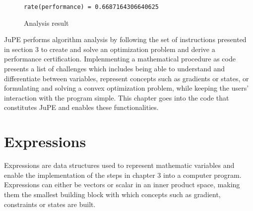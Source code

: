 \begin{figure}[hbtp]
\begin{lstlisting}
rate(performance) = 0.6687164306640625
\end{lstlisting}
\caption{Analysis result}
\label{ex_result}
\end{figure}

JuPE performs algorithm analysis by following the set of instructions presented in section 3 to create and solve an optimization problem and derive a performance certification. Implenmenting a mathematical procedure as code presents a list of challenges which includes being able to understand and differentiate between variables, represent concepts such as gradients or states, or formulating and solving a convex optimization problem, while keeping the users' interaction with the program simple. This chapter goes into the code that constitutes JuPE and enables these functionalities.

\section{Expressions}

Expressions are data structures used to represent mathematic variables and enable the implementation of the steps in chapter 3 into a computer program. Expressions can either be vectors or scalar in an inner product space, making them the smallest building block with which concepts such as gradient, constraints or states are built.

